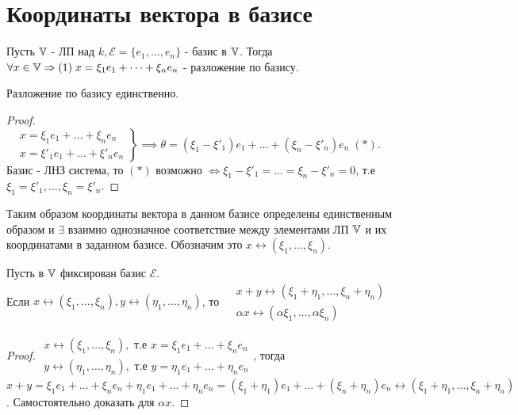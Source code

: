 \documentclass[../main.tex]{subfiles}
\begin{document}
\section{Координаты вектора в базисе}
Пусть $\mathbb{V}$ - ЛП над $k, \mathcal{E} = \{e_{1},\dots,e_{n}\}$ - базис в $\mathbb{V}$. Тогда $\forall x \in \mathbb{V}\Rightarrow (1)\; x=\xi_{1}e_{1}+\dots+\xi_{n}e_{n}$ - разложение по базису.  
\begin{lemma}
    Разложение по базису единственно. 
\end{lemma}
\begin{proof}
    $\left.\begin{aligned}
        &x= \xi_{1}e_{1}+\dots+\xi_{n}e_{n} \\ 
        &x= \xi'_{1}e_{1}+\dots+\xi'_{n}e_{n}
    \end{aligned}\right\}\implies \theta = (\xi_{1}-\xi'_{1})e_{1}+\dots+(\xi_{n}-\xi'_{n})e_{n}\;(*)$. Базис - ЛНЗ система, то $(*)$ возможно $\Leftrightarrow \xi_{1} - \xi'_{1} = \dots = \xi_{n} - \xi'_{n} = 0$, т.е $\xi_{1} = \xi'_{1},\dots,\xi_{n} = \xi'_{n}$. 
\end{proof}
Таким образом координаты вектора в данном базисе определены единственным образом и $\exists$ взаимно однозначное соответствие между элементами ЛП $\mathbb{V}$ и их координатами в заданном базисе. Обозначим это $x \leftrightarrow (\xi_{1},\dots,\xi_{n})$.
\begin{theorem}
    Пусть в $\mathbb{V}$ фиксирован базис $\mathcal{E}$. 
    \\Если $x \leftrightarrow (\xi_{1},\dots,\xi_{n}), y \leftrightarrow (\eta_{1},\dots,\eta_{n})$, то $\begin{aligned} 
        &x+y \leftrightarrow (\xi_{1}+\eta_{1},\dots,\xi_{n}+\eta_{n}) \\ 
        &\alpha x \leftrightarrow (\alpha \xi_{1},\dots,\alpha \xi_{n})
    \end{aligned}$
\end{theorem}
\begin{proof}
$\begin{aligned}
    x\leftrightarrow (\xi_{1},\dots,\xi_{n}), \text{ т.е } x = \xi_{1}e_{1}+\dots+\xi_{n}e_{n}\\
    y\leftrightarrow (\eta_{1},\dots,\eta_{n}), \text{ т.е } y = \eta_{1}e_{1}+\dots+\eta_{n}e_{n}
\end{aligned}$, тогда $x+y = \xi_{1}e_{1} + \dots+ \xi_{n}e_{n} + \eta_{1}e_{1} + \dots + \eta_{n}e_{n} = (\xi_{1}+\eta_{1})e_{1}+\dots+(\xi_{n}+\eta_{n})e_{n} \leftrightarrow (\xi_{1}+\eta_{1},\dots,\xi_{n}+\eta_{n})$.     
Самостоятельно доказать для $\alpha x$.
\end{proof}
\end{document}
